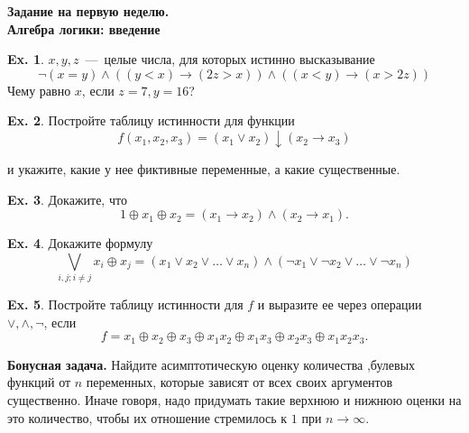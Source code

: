 \documentclass[12pt,a5paper,fleqn]{article}
\theoremstyle{definition}
\newtheorem{Def}{Def.}
\newtheorem{Ex}{Ex.}
\begin{document}
\begin{center}
	{\bf \Large Задание на первую неделю. \\ \normalsize Алгебра логики: введение}
\end{center}
\vspace{0.6cm}

%

\begin{Ex}
	$x,y,z$~---~целые числа, для которых истинно высказывание
$$
	\neg(x=y)\wedge ((y<x)\to(2z>x))\wedge((x<y)\to(x>2z))
$$
	Чему равно $x$, если $z=7,y=16$?
\end{Ex}

\begin{Ex}
	Постройте таблицу истинности для функции
$$
	f(x_1, x_2, x_3) = (x_1 \vee x_2) \downarrow (x_2\to x_3)
$$
	
	и укажите, какие у нее фиктивные переменные, а какие существенные.
\end{Ex}

\begin{Ex}
	Докажите, что
$$
	1 \oplus x_1 \oplus x_2 = (x_1\to x_2)\wedge(x_2\to x_1).
$$
\end{Ex}

\begin{Ex}
	Докажите формулу
$$
	\bigvee_{i,j; i\neq j} x_i \oplus x_j =(x_1\vee x_2\vee\ldots\vee x_n)
	\wedge (\neg x_1\vee\neg x_2\vee\ldots\vee \neg x_n)
$$
\end{Ex}

\begin{Ex}
	Постройте таблицу истинности для $f$ и выразите ее через операции
	$\vee, \wedge, \neg$, если
$$
	f = x_1 \oplus x_2 \oplus x_3 \oplus x_1x_2 \oplus x_1x_3
	\oplus x_2x_3 \oplus x_1x_2x_3.
$$
\end{Ex}

\textbf{Бонусная задача.} Найдите асимптотическую оценку количества ,булевых 
функций от $n$ переменных, которые зависят от всех своих аргументов существенно. 
Иначе говоря, надо придумать такие верхнюю и нижнюю оценки на это количество, 
чтобы их отношение стремилось к $1$ при $n\to\infty$.
\end{document}

